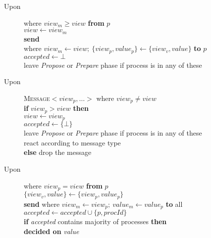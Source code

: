 \begin{table}
\begin{description}
 \vspace{-0.5em}
 \item[Upon]  where $\textit{view}_m \geq \textit{view}$ \textbf{from} $p$  \\
   $\textit{view} \leftarrow \textit{view}_m$ \\
   \textbf{send}  \\
       \hspace*{0.2\textwidth} where $\textit{view}_m \leftarrow \textit{view};~\{\textit{view}_p, \textit{value}_p\} \leftarrow \{\textit{view}_v, \textit{value}\}$ \textbf{to} $p$ \\
   $\textit{accepted} \leftarrow \bot $ \\
   leave \textsl{Propose} or \textsl{Prepare} phase if process is in any of these

 \vspace{-0.5em}
 \item[Upon] \textsc{Message$<\textit{view}_p, \ldots>$} where $\textit{view}_p \neq \textit{view}$ \\
   \textbf{if} $\textit{view}_p > \textit{view}$ \textbf{then} \\
     \hspace*{\defaultParIndent} $\textit{view} \leftarrow \textit{view}_p$ \\
     \hspace*{\defaultParIndent} $\textit{accepted} \leftarrow \{ \bot \} $ \\
     \hspace*{\defaultParIndent} leave \textsl{Propose} or \textsl{Prepare} phase if process is in any of these \\
     \hspace*{\defaultParIndent} react according to message type \\
   \textbf{else} drop the message

 \vspace{-0.5em}
 \item[Upon]  where $\textit{view}_p = \textit{view}$ \textbf{from} $p$ \\
   $\{\textit{view}_v, \textit{value}\} \leftarrow \{\textit{view}_p, \textit{value}_p\}$ \\
   \textbf{send}  where $\textit{view}_m \leftarrow \textit{view}_p;~\textit{value}_m \leftarrow \textit{value}_p$ \textbf{to} all\\
   $\textit{accepted} \leftarrow \textit{accepted} \cup \{ p, \textit{procId} \} $\\
   \textbf{if} \textit{accepted} contains majority of processes \textbf{then} \\
     \hspace*{\defaultParIndent} \textbf{decided on} \textit{value}


\end{description}
\end{table}
